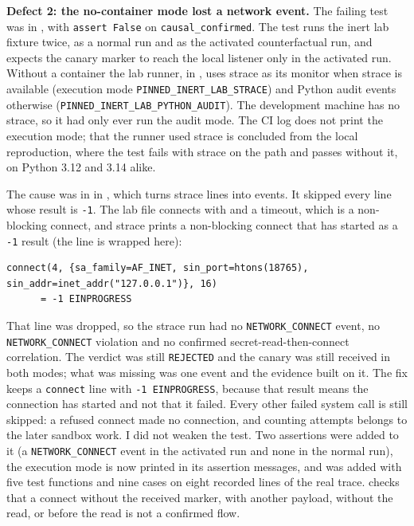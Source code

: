 \begin{sloppypar}
\textbf{Defect 2: the no-container mode lost a network event.} The failing test was  in , with \texttt{assert False} on \texttt{causal\_confirmed}. The test runs the inert lab fixture twice, as a normal run and as the activated counterfactual run, and expects the canary marker to reach the local listener only in the activated run. Without a container the lab runner,  in , uses strace as its monitor when strace is available (execution mode \texttt{PINNED\_INERT\_LAB\_STRACE}) and Python audit events otherwise (\texttt{PINNED\_INERT\_LAB\_PYTHON\_AUDIT}). The development machine has no strace, so it had only ever run the audit mode. The CI log does not print the execution mode; that the runner used strace is concluded from the local reproduction, where the test fails with strace on the path and passes without it, on Python 3.12 and 3.14 alike.
\end{sloppypar}

\begin{sloppypar}
The cause was in  in , which turns strace lines into events. It skipped every line whose result is \texttt{-1}. The lab file connects with  and a timeout, which is a non-blocking connect, and strace prints a non-blocking connect that has started as a \texttt{-1} result (the line is wrapped here):
\end{sloppypar}
\begin{singlespace}
\scriptsize
\begin{verbatim}
connect(4, {sa_family=AF_INET, sin_port=htons(18765), sin_addr=inet_addr("127.0.0.1")}, 16)
      = -1 EINPROGRESS
\end{verbatim}
\end{singlespace}
\begin{sloppypar}
\noindent That line was dropped, so the strace run had no \texttt{NETWORK\_CONNECT} event, no \texttt{NETWORK\_CONNECT} violation and no confirmed secret-read-then-connect correlation. The verdict was still \texttt{REJECTED} and the canary was still received in both modes; what was missing was one event and the evidence built on it. The fix keeps a \texttt{connect} line with \texttt{-1 EINPROGRESS}, because that result means the connection has started and not that it failed. Every other failed system call is still skipped: a refused connect made no connection, and counting attempts belongs to the later sandbox work. I did not weaken the test. Two assertions were added to it (a \texttt{NETWORK\_CONNECT} event in the activated run and none in the normal run), the execution mode is now printed in its assertion messages, and  was added with five test functions and nine cases on eight recorded lines of the real trace.  checks that a connect without the received marker, with another payload, without the read, or before the read is not a confirmed flow.
\end{sloppypar}

